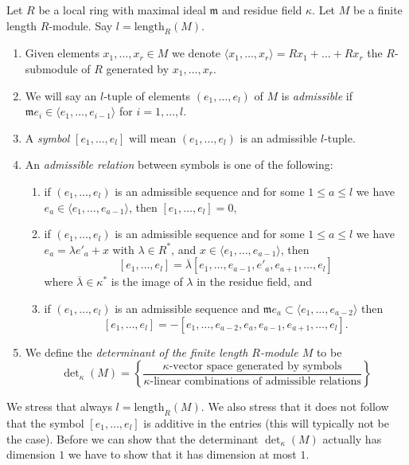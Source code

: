 \begin{definition}
\label{definition-determinant}
Let $R$ be a local ring with maximal ideal $\mathfrak m$ and
residue field $\kappa$. Let $M$ be a finite length $R$-module.
Say $l = \text{length}_R(M)$.
\begin{enumerate}
\item Given elements $x_1, \ldots, x_r \in M$ we denote
$\langle x_1, \ldots, x_r \rangle = Rx_1 + \ldots + Rx_r$ the
$R$-submodule of $R$ generated by $x_1, \ldots, x_r$.
\item We will say an $l$-tuple of elements
$(e_1, \ldots, e_l)$ of $M$ is {\it admissible} if
$\mathfrak m e_i \in \langle e_1, \ldots, e_{i - 1} \rangle$
for $i = 1, \ldots, l$.
\item A {\it symbol} $[e_1, \ldots, e_l]$ will mean
$(e_1, \ldots, e_l)$ is an admissible $l$-tuple.
\item An {\it admissible relation} between symbols is one of the following:
\begin{enumerate}
\item if $(e_1, \ldots, e_l)$ is an admissible sequence and
for some $1 \leq a \leq l$ we have
$e_a \in \langle e_1, \ldots, e_{a - 1}\rangle$, then
$[e_1, \ldots, e_l] = 0$,
\item if $(e_1, \ldots, e_l)$ is an admissible sequence and
for some $1 \leq a \leq l$ we have $e_a = \lambda e'_a + x$
with $\lambda \in R^*$, and
$x \in \langle e_1, \ldots, e_{a - 1}\rangle$, then
$$
[e_1, \ldots, e_l] =
\overline{\lambda} [e_1, \ldots, e_{a - 1}, e'_a, e_{a + 1}, \ldots, e_l]
$$
where $\overline{\lambda} \in \kappa^*$ is the image of $\lambda$ in
the residue field, and
\item if $(e_1, \ldots, e_l)$ is an admissible sequence and
$\mathfrak m e_a \subset \langle e_1, \ldots, e_{a - 2}\rangle$ then
$$
[e_1, \ldots, e_l] =
- [e_1, \ldots, e_{a - 2}, e_a, e_{a - 1}, e_{a + 1}, \ldots, e_l].
$$
\end{enumerate}
\item
We define the {\it determinant of the finite length $R$-module $M$} to be
$$
\det\nolimits_\kappa(M) =
\left\{
\frac{\kappa\text{-vector space generated by symbols}}
{\kappa\text{-linear combinations of admissible relations}}
\right\}
$$
\end{enumerate}
\end{definition}

\noindent
We stress that always $l = \text{length}_R(M)$. We also stress that
it does not follow that the symbol $[e_1, \ldots, e_l]$ is
additive in the entries (this will typically not be the case).
Before we can show that the determinant $\det_\kappa(M)$ actually
has dimension $1$ we have to show that it has dimension at most $1$.


